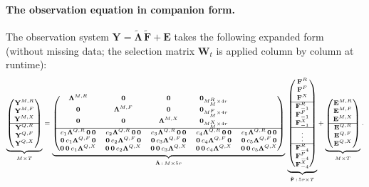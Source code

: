 \documentclass[11pt, a4paper, oneside]{article}
\newcommand{\mL}{\boldsymbol{\Lambda}}
\begin{document}
\paragraph{The observation equation in companion form.}
The observation system $\mathbf{Y} = \tilde{\mL}\,\tilde{\mathbf{F}} + \mathbf{E}$
takes the following expanded form (without missing data; the
selection matrix $\mathbf{W}_t$ is applied column by column at
runtime):
\[
\scriptsize
\underbrace{\begin{pmatrix}
\mathbf{Y}^{M,R} \\
\mathbf{Y}^{M,F} \\
\mathbf{Y}^{M,X} \\
\hline
\mathbf{Y}^{Q,R} \\
\mathbf{Y}^{Q,F} \\
\mathbf{Y}^{Q,X}
\end{pmatrix}}_{M \times T}
=
\underbrace{\begin{pmatrix}
\mL^{M,R} & \mathbf{0} & \mathbf{0} & \mathbf{0}_{M_M^R \times 4r} \\
\mathbf{0} & \mL^{M,F} & \mathbf{0} & \mathbf{0}_{M_M^F \times 4r} \\
\mathbf{0} & \mathbf{0} & \mL^{M,X} & \mathbf{0}_{M_M^X \times 4r} \\
\hline
c_1 \mL^{Q,R}\,\mathbf{0}\,\mathbf{0} & c_2 \mL^{Q,R}\,\mathbf{0}\,\mathbf{0} & c_3 \mL^{Q,R}\,\mathbf{0}\,\mathbf{0} & c_4 \mL^{Q,R}\,\mathbf{0}\,\mathbf{0} & c_5 \mL^{Q,R}\,\mathbf{0}\,\mathbf{0} \\
\mathbf{0}\,c_1 \mL^{Q,F}\,\mathbf{0} & \mathbf{0}\,c_2 \mL^{Q,F}\,\mathbf{0} & \mathbf{0}\,c_3 \mL^{Q,F}\,\mathbf{0} & \mathbf{0}\,c_4 \mL^{Q,F}\,\mathbf{0} & \mathbf{0}\,c_5 \mL^{Q,F}\,\mathbf{0} \\
\mathbf{0}\,\mathbf{0}\,c_1 \mL^{Q,X} & \mathbf{0}\,\mathbf{0}\,c_2 \mL^{Q,X} & \mathbf{0}\,\mathbf{0}\,c_3 \mL^{Q,X} & \mathbf{0}\,\mathbf{0}\,c_4 \mL^{Q,X} & \mathbf{0}\,\mathbf{0}\,c_5 \mL^{Q,X}
\end{pmatrix}}_{\tilde{\mL}\,:\, M \times 5r}
\,
\underbrace{\begin{pmatrix}
\mathbf{F}^R \\
\mathbf{F}^F \\
\mathbf{F}^X \\
\hline
\mathbf{F}^R_{-1} \\
\mathbf{F}^F_{-1} \\
\mathbf{F}^X_{-1} \\
\hline
\vdots \\
\hline
\mathbf{F}^R_{-4} \\
\mathbf{F}^F_{-4} \\
\mathbf{F}^X_{-4}
\end{pmatrix}}_{\tilde{\mathbf{F}}\,:\,5r \times T}
+
\underbrace{\begin{pmatrix}
\mathbf{E}^{M,R} \\
\mathbf{E}^{M,F} \\
\mathbf{E}^{M,X} \\
\hline
\mathbf{E}^{Q,R} \\
\mathbf{E}^{Q,F} \\
\mathbf{E}^{Q,X}
\end{pmatrix}}_{M \times T}.
\]
\end{document}
